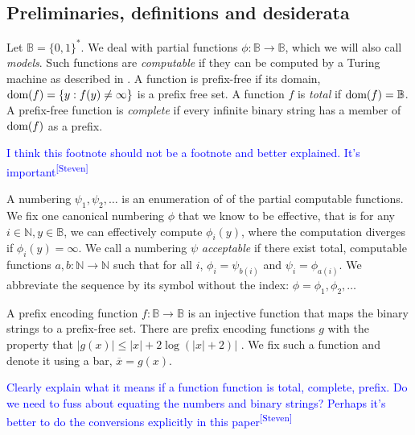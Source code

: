 \documentclass{style/llncs}
\newcommand{\B}{\mathbb B}
\newcommand{\N}{\mathbb N}
\newcommand{\tn}[1]{\textnormal{#1}}
\newcommand{\br}[1]{\overline{#1}}
\newcommand{\dom}[1]{\mathop{\tn{dom}(#1)}}
\newcommand{\sdr}[1]{\textcolor{blue}{\small #1\textsuperscript{[Steven]} }}
\begin{document}
\subsection{Preliminaries, definitions and desiderata}

Let $\B = \{0,1\}^*$. We deal with partial functions $\phi: \B \to \B$, which we will also call \emph{models}. Such functions are \emph{computable} if they can be computed by a Turing machine as described in \cite[Definition~1.7.1]{li1993introduction}. A function is prefix-free if its domain, $\dom{f} = \{y : f(y) \neq \infty\}$ is a prefix free set. A function $f$ is \emph{total} if $\dom{f} = \B$. A prefix-free function is \emph{complete} if every infinite binary string has a member of $\dom{f}$ as a prefix.\footnotemark 

\sdr{I think this footnote should not be a footnote and better explained. It's important}


\begin{definition}[Numberings]
A numbering $\psi_1,\psi_2,\ldots$ is an enumeration of of the partial computable functions. We fix one canonical numbering $\phi$ that we know to be effective, that is for any $i \in \N, y\in \B$, we can effectively compute $\phi_i(y)$, where the computation diverges if $\phi_i(y) = \infty$. We call a numbering $\psi$ \emph{acceptable} if there exist total, computable functions $a, b: \N \to \N$ such that for all $i$, $\phi_i = \psi_{b(i)}$ and  $\psi_i = \phi_{a(i)}$.  We abbreviate the sequence by its symbol without the index: $\phi=\phi_1,\phi_2,\ldots$
\end{definition}

\begin{definition}
  A prefix encoding function $f:\B\to\B$ is an injective
  function that maps the binary strings to a prefix-free set. There
  are prefix encoding functions $g$ with the property that
  $|g(x)|\le|x|+2\log(|x|+2)|$ \cite{li1993introduction}. We fix such a function and
  denote it using a bar, $\br{x}=g(x)$.
\end{definition}

\sdr{Clearly explain what it means if a function function is total, complete, prefix. Do we need to fuss about equating the numbers and binary strings? Perhaps it's better to do the conversions explicitly in this paper}
\end{document}
